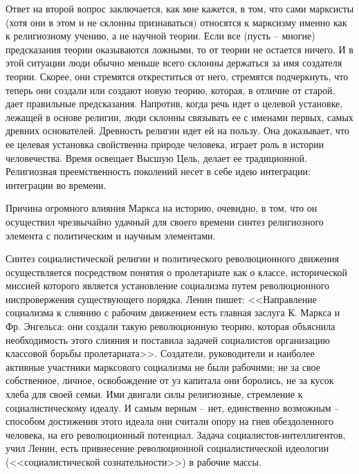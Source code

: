 \documentclass{book}
\begin{document}
Ответ на второй вопрос заключается, как мне кажется, в том, что сами марксисты (хотя они в этом и не склонны признаваться) относятся к марксизму именно как к религиозному учению,  а не научной теории. Если все (пусть -- многие) предсказания теории оказываются ложными, то от теории не остается ничего. И в этой ситуации люди обычно меньше всего склонны держаться за имя создателя теории. Скорее, они стремятся откреститься от него, стремятся подчеркнуть, что теперь они создали или создают новую  теорию, которая, в отличие от старой. дает правильные предсказания. Напротив, когда речь идет о целевой установке, лежащей в основе религии, люди склонны связывать ее с именами первых, самых древних основателей. Древность религии идет ей на пользу. Она доказывает, что ее целевая установка свойственна природе человека, играет роль в истории человечества. Время освещает Высшую Цель, делает ее традиционной. Религиозная преемственность поколений несет в себе идею интеграции: интеграции во времени.

Причина огромного влияния Маркса на историю, очевидно, в том, что он осуществил чрезвычайно удачный для своего вре­мени синтез религиозного элемента с политическим и научным элементами.

Синтез социалистической религии и политического революционного движения осуществляется посредством понятия о пролетариате как о классе, исторической миссией которого является установление социализма путем революционного ниспровержения существующего порядка. Ленин пишет: <<Направ­ление социализма к слиянию с рабочим движением есть главная заслуга К. Маркса и Фр. Энгельса: они создали такую револю­ционную теорию, которая объяснила необходимость этого слия­ния и поставила задачей социалистов организацию классовой борьбы пролетариата>>. Создатели, руководители и наиболее активные участники марксового социализма не были рабочими; не за свое собственное, личное, освобождение от уз капитала они боролись, не за кусок хлеба для своей семьи. Ими двигали силы религиозные, стремление к социалистическому иде­алу. И самым верным -- нет, единственно возможным -- способом достижения этого идеала они считали опору на гнев обездоленного человека, на его революционный потенциал. Задача социалистов-интеллигентов, учил Ленин, есть 
привнесение революционной социалистической идеологии (<<социалистической сознательности>>) в рабочие массы.
\end{document}
